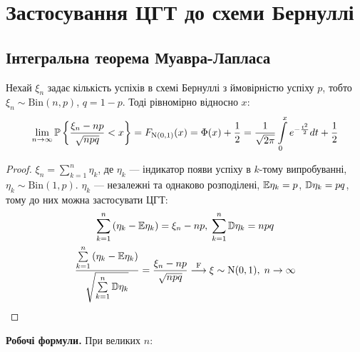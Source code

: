 \section{Застосування ЦГТ до схеми Бернуллі}\label{binom_theorems}
\subsection{Інтегральна теорема Муавра-Лапласа}
\begin{theorem*}
    Нехай $\xi_n$ задає кількість успіхів в схемі Бернуллі з ймовірністю успіху $p$, тобто $\xi_n \sim \mathrm{Bin}(n, p)$,
    $q = 1-p$.
    Тоді рівномірно відносно $x$:
    \begin{gather}
        \lim_{n \rightarrow \infty} \P \left\{
            \frac{\xi_n - np}{\sqrt{npq}}
            < x
        \right\} = F_{\mathrm{N}(0, 1)}(x) = \Phi(x) + \frac{1}{2} = 
        \frac{1}{\sqrt{2\pi}} \int\limits_0^x e^{-\frac{t^2}{2}} dt + \frac{1}{2}
    \end{gather}
\end{theorem*}
\begin{proof}
    $\xi_n = \sum\limits_{k=1}^n \eta_k$, де $\eta_k$ --- індикатор появи успіху в $k$-тому випробуванні,
    $\eta_k \sim \mathrm{Bin}(1, p)$. $\eta_k$ --- незалежні та однаково розподілені, $\E\eta_k = p$, $\D\eta_k = pq$,
    тому до них можна застосувати ЦГТ:
    \begin{gather*}
        \sum\limits_{k=1}^n \left( \eta_k - \E\eta_k\right) = \xi_n - np, \; \sum\limits_{k=1}^n \D\eta_k = n p q \\
        \frac{\sum\limits_{k=1}^n \left( \eta_k - \E\eta_k\right)}{\sqrt{\sum\limits_{k=1}^n \D\eta_k}} =
         \frac{\xi_n - np}{\sqrt{n p q}} \overset{\mathrm{F}}{\longrightarrow} \xi \sim \mathrm{N}(0, 1), \; n\to \infty
    \end{gather*}
\end{proof}
\noindent\textbf{Робочі формули.} При великих $n$:
